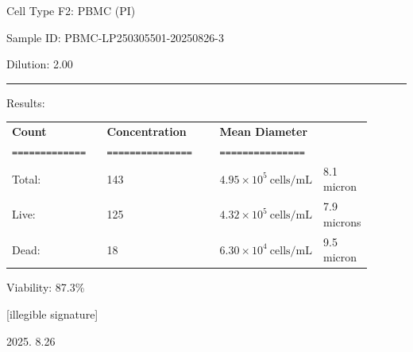 \documentclass[UTF8,10pt,a4paper,fontset=fandol]{ctexart}
\newcommand{\fieldvalue}[1]{#1}
\newcommand{\handwritten}[1]{#1}
\begin{document}
Cell Type F2: 
\fieldvalue{PBMC (PI)}

Sample ID: 
\fieldvalue{PBMC-LP250305501-20250826-3}

Dilution: 
\fieldvalue{2.00}

\vspace{1em}
\hrule
\vspace{1em}

Results:

\begin{tabular}{@{}p{0.28\linewidth}p{0.34\linewidth}p{0.28\linewidth}@{}}
\textbf{Count} & \textbf{Concentration} & \textbf{Mean Diameter} \\
\verb|=============| & \verb|===============| & \verb|===============| \\[2pt]

Total: &
\fieldvalue{143}
&
\fieldvalue{$4.95 \times 10^{5}\ \mathrm{cells/mL}$}
&
\fieldvalue{8.1 micron}
\\

Live: &
\fieldvalue{125}
&
\fieldvalue{$4.32 \times 10^{5}\ \mathrm{cells/mL}$}
&
\fieldvalue{7.9 microns}
\\

Dead: &
\fieldvalue{18}
&
\fieldvalue{$6.30 \times 10^{4}\ \mathrm{cells/mL}$}
&
\fieldvalue{9.5 micron}
\end{tabular}

\vspace{1.5em}

Viability:
\fieldvalue{87.3\%}

\vfill

\handwritten{[illegible signature]}

\handwritten{2025. 8.26}
\end{document}
